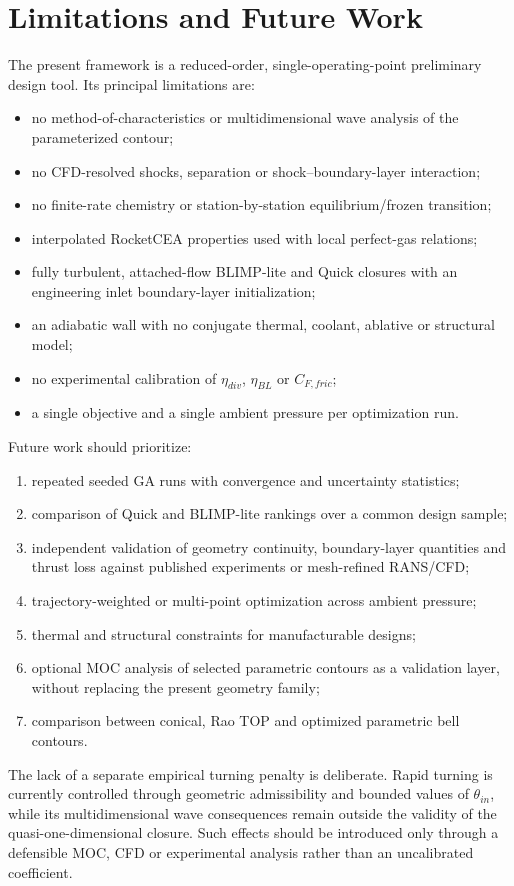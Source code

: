 \section{Limitations and Future Work}

The present framework is a reduced-order, single-operating-point preliminary design
tool. Its principal limitations are:
\begin{itemize}
    \item no method-of-characteristics or multidimensional wave analysis of the
    parameterized contour;
    \item no CFD-resolved shocks, separation or shock--boundary-layer interaction;
    \item no finite-rate chemistry or station-by-station equilibrium/frozen transition;
    \item interpolated RocketCEA properties used with local perfect-gas relations;
    \item fully turbulent, attached-flow BLIMP-lite and Quick closures with an
    engineering inlet boundary-layer initialization;
    \item an adiabatic wall with no conjugate thermal, coolant, ablative or structural model;
    \item no experimental calibration of \(\eta_{div}\), \(\eta_{BL}\) or
    \(C_{F,fric}\);
    \item a single objective and a single ambient pressure per optimization run.
\end{itemize}

Future work should prioritize:
\begin{enumerate}
    \item repeated seeded GA runs with convergence and uncertainty statistics;
    \item comparison of Quick and BLIMP-lite rankings over a common design sample;
    \item independent validation of geometry continuity, boundary-layer quantities and
    thrust loss against published experiments or mesh-refined RANS/CFD;
    \item trajectory-weighted or multi-point optimization across ambient pressure;
    \item thermal and structural constraints for manufacturable designs;
    \item optional MOC analysis of selected parametric contours as a validation layer,
    without replacing the present geometry family;
    \item comparison between conical, Rao TOP and optimized parametric bell contours.
\end{enumerate}

The lack of a separate empirical turning penalty is deliberate. Rapid turning is
currently controlled through geometric admissibility and bounded values of
\(\theta_{in}\), while its multidimensional wave consequences remain outside the
validity of the quasi-one-dimensional closure. Such effects should be introduced only
through a defensible MOC, CFD or experimental analysis rather than an uncalibrated
coefficient.
